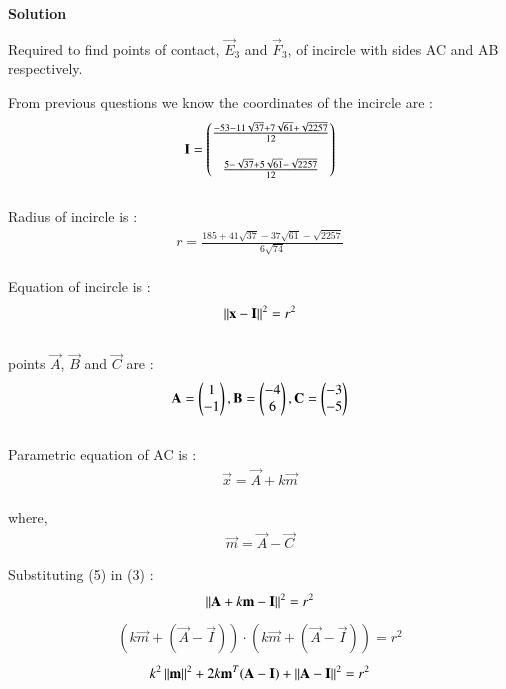 \documentclass[journal,12pt,twocolumn]{IEEEtran}
\theoremstyle{remark}
\begin{document}
\begin{flushleft}
	\textbf{Solution}\\
	\bigskip

	Required to find points of contact, $\vec{E}_3$ and $\vec{F}_3$, of incircle with sides AC and AB respectively.\\

	\bigskip

	From previous questions we know the coordinates of the incircle are : 
	\begin{align}
		\mathbf{I} = 
		\begin{pmatrix}
			\frac{-53-11\sqrt{37}+7\sqrt{61}+\sqrt{2257}}{12} \\ \\
			\frac{5-\sqrt{37}+5\sqrt{61}-\sqrt{2257}}{12}
		\end{pmatrix}
	\end{align}\\

	Radius of incircle is :
    \begin{align}
		r = \frac{185+41\sqrt{37}-37\sqrt{61}-\sqrt{2257}}{6\sqrt{74}}
    \end{align}\\

	Equation of incircle is : 
	\begin{align}
		{\left\lVert \mathbf{x}-\mathbf{I} \right\rVert}^2 = {r}^2 
	\end{align}\\

	points $\vec{A}$, $\vec{B}$ and $\vec{C}$ are : 
	\begin{align}
		\mathbf{A} = \begin{pmatrix}
			1\\
			-1
		\end{pmatrix}, 
		\mathbf{B} = \begin{pmatrix}
			-4\\
			6
		\end{pmatrix}, 
		\mathbf{C} = \begin{pmatrix}
			-3\\
			-5
		\end{pmatrix}
	\end{align}\\

	Parametric equation of AC is :
	\begin{align}
		\vec{x} = \vec{A} + k\vec{m}
	\end{align}\\

	where,
	\begin{align}
		\vec{m} = \vec{A} - \vec{C}
	\end{align}
	
	Substituting (5) in (3) : 
	\begin{align}
		{\left\lVert \mathbf{A}+k\mathbf{m}-\mathbf{I} \right\rVert}^2 = {r}^2 
	\end{align}
	\begin{align}
		(k\vec{m} + (\vec{A} - \vec{I}))\cdot(k\vec{m} + (\vec{A} - \vec{I})) = {r}^2
	\end{align}
	\begin{align}
		k^2 \left\lVert\mathbf{m}\right\rVert^2 + 2k\mathbf{m}^T (\mathbf{A}-\mathbf{I}) + \left\lVert\mathbf{A}-\mathbf{I}\right\rVert^2 = {r}^2
	\end{align}


\end{flushleft}
\end{document}
